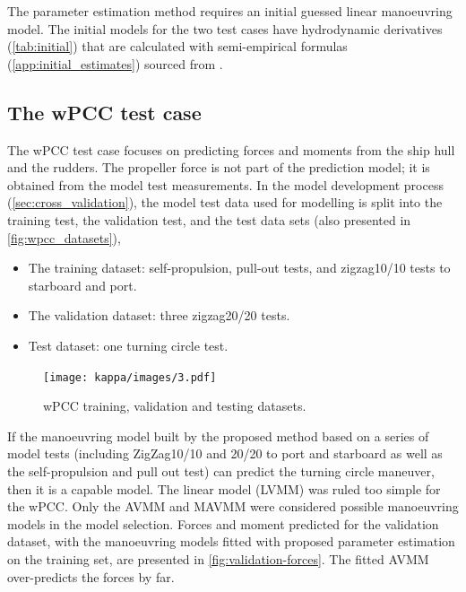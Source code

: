 


\noindent The parameter estimation method requires an initial guessed linear manoeuvring model. The initial models for the two test cases have hydrodynamic derivatives (\autoref{tab:initial}) that are calculated with semi-empirical formulas (\autoref{app:initial_estimates}) sourced from \textcite{brixManoeuvringTechnicalManual1993}. 

\clearpage
\subsection{The wPCC test case}
\label{\detokenize{05.01_case_studies:the-wpcc-test-scenarios}}
The wPCC test case focuses on predicting forces and moments from the ship hull and the rudders. The propeller force is not part of the prediction model; it is obtained from the model test measurements.
In the model development process (\autoref{sec:cross_validation}), the model test data used for modelling is split into the training test, the validation test, and the test data sets (also presented in \autoref{fig:wpcc_datasets}), 
\vspace{5pt}
\begin{itemize}
    \setlength\itemsep{5pt}
    \item The training dataset: self-propulsion, pull-out tests, and zigzag10/10 tests to starboard and port.
    \item The validation dataset: three zigzag20/20 tests.
    \item Test dataset: one turning circle test.
\end{itemize}
\begin{figure}[h!]
\centering
\texttt{[image: kappa/images/3.pdf]}
\caption{wPCC training, validation and testing datasets.}
\label{fig:wpcc_datasets}
\end{figure}
\noindent If the manoeuvring model built by the proposed method based on a series of model tests (including ZigZag10/10 and 20/20 to port and starboard as well as the self-propulsion and pull out test) \cite{imoStandardsShipManoeuvrability2002} can predict the turning circle maneuver, then it is a capable model. The linear model (LVMM) was ruled too simple for the wPCC. Only the AVMM and MAVMM were considered possible manoeuvring models in the model selection.
Forces and moment predicted for the validation dataset, with the manoeuvring models fitted with proposed parameter estimation on the training set, are presented in \autoref{fig:validation-forces}. The fitted AVMM over-predicts the forces by far. 
